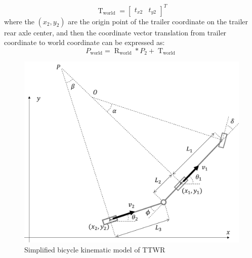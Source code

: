 \begin{equation}
\operatorname{T}_\text{world} =\left[\begin{array}{ccc}
t_{x2} & t_{y2}
\end{array}\right]^T
\label{eq: translation matrix}
\end{equation}
where the $(x_2, y_2)$ are the origin point of the trailer coordinate on the trailer rear axle center, and then the coordinate vector translation from trailer coordinate to world coordinate can be expressed as:
\begin{equation}
P_\text{world}=\operatorname{R}_\text{world} * P_2 + \operatorname{T}_\text{world}
\label{eq: transform coordinate 2 to coordinate world}
\end{equation}

\begin{figure}[h]
\centering
\includegraphics[scale=0.35]{fig/bicycle_vehicle_model.png}
\caption{Simplified bicycle kinematic model of TTWR}
\label{fig:Simplified bicycle kinematic model of TTWR}
\end{figure}

